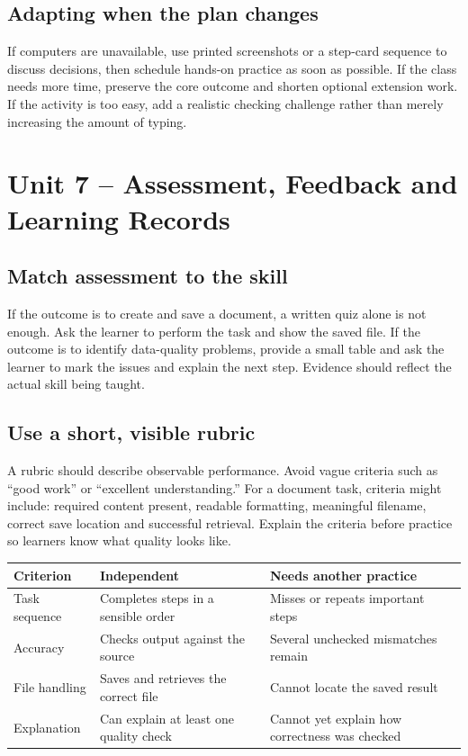 \documentclass[11pt,openany,oneside]{book}
\begin{document}
\section{Adapting when the plan changes}
If computers are unavailable, use printed screenshots or a step-card sequence to discuss decisions, then schedule hands-on practice as soon as possible. If the class needs more time, preserve the core outcome and shorten optional extension work. If the activity is too easy, add a realistic checking challenge rather than merely increasing the amount of typing.

\chapter{Unit 7 -- Assessment, Feedback and Learning Records}
\section{Match assessment to the skill}
If the outcome is to create and save a document, a written quiz alone is not enough. Ask the learner to perform the task and show the saved file. If the outcome is to identify data-quality problems, provide a small table and ask the learner to mark the issues and explain the next step. Evidence should reflect the actual skill being taught.
\section{Use a short, visible rubric}
A rubric should describe observable performance. Avoid vague criteria such as “good work” or “excellent understanding.” For a document task, criteria might include: required content present, readable formatting, meaningful filename, correct save location and successful retrieval. Explain the criteria before practice so learners know what quality looks like.
\begin{center}\small\begin{tabularx}{\textwidth}{|p{}|X|X|}\hline
\textbf{Criterion} & \textbf{Independent} & \textbf{Needs another practice}\\\hline
Task sequence & Completes steps in a sensible order & Misses or repeats important steps\\\hline
Accuracy & Checks output against the source & Several unchecked mismatches remain\\\hline
File handling & Saves and retrieves the correct file & Cannot locate the saved result\\\hline
Explanation & Can explain at least one quality check & Cannot yet explain how correctness was checked\\\hline
\end{tabularx}\end{center}
\end{document}
